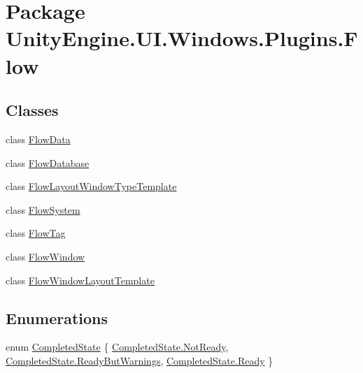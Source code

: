 \hypertarget{namespace_unity_engine_1_1_u_i_1_1_windows_1_1_plugins_1_1_flow}{}\section{Package Unity\+Engine.\+U\+I.\+Windows.\+Plugins.\+Flow}
\label{namespace_unity_engine_1_1_u_i_1_1_windows_1_1_plugins_1_1_flow}
\subsection*{Classes}
\begin{DoxyCompactItemize}
\item 
class \hyperlink{class_unity_engine_1_1_u_i_1_1_windows_1_1_plugins_1_1_flow_1_1_flow_data}{Flow\+Data}
\item 
class \hyperlink{class_unity_engine_1_1_u_i_1_1_windows_1_1_plugins_1_1_flow_1_1_flow_database}{Flow\+Database}
\item 
class \hyperlink{class_unity_engine_1_1_u_i_1_1_windows_1_1_plugins_1_1_flow_1_1_flow_layout_window_type_template}{Flow\+Layout\+Window\+Type\+Template}
\item 
class \hyperlink{class_unity_engine_1_1_u_i_1_1_windows_1_1_plugins_1_1_flow_1_1_flow_system}{Flow\+System}
\item 
class \hyperlink{class_unity_engine_1_1_u_i_1_1_windows_1_1_plugins_1_1_flow_1_1_flow_tag}{Flow\+Tag}
\item 
class \hyperlink{class_unity_engine_1_1_u_i_1_1_windows_1_1_plugins_1_1_flow_1_1_flow_window}{Flow\+Window}
\item 
class \hyperlink{class_unity_engine_1_1_u_i_1_1_windows_1_1_plugins_1_1_flow_1_1_flow_window_layout_template}{Flow\+Window\+Layout\+Template}
\end{DoxyCompactItemize}
\subsection*{Enumerations}
\begin{DoxyCompactItemize}
\item 
enum \hyperlink{namespace_unity_engine_1_1_u_i_1_1_windows_1_1_plugins_1_1_flow_a4525a1ea5727aeeef99ada173b0bd2b2}{Completed\+State} \{ \hyperlink{namespace_unity_engine_1_1_u_i_1_1_windows_1_1_plugins_1_1_flow_a4525a1ea5727aeeef99ada173b0bd2b2add353567e8118a2b8df4e822e59084ab}{Completed\+State.\+Not\+Ready}, 
\hyperlink{namespace_unity_engine_1_1_u_i_1_1_windows_1_1_plugins_1_1_flow_a4525a1ea5727aeeef99ada173b0bd2b2ab5d9421a539e61b2a8751470c242cdd4}{Completed\+State.\+Ready\+But\+Warnings}, 
\hyperlink{namespace_unity_engine_1_1_u_i_1_1_windows_1_1_plugins_1_1_flow_a4525a1ea5727aeeef99ada173b0bd2b2ae7d31fc0602fb2ede144d18cdffd816b}{Completed\+State.\+Ready}
 \}
\end{DoxyCompactItemize}


